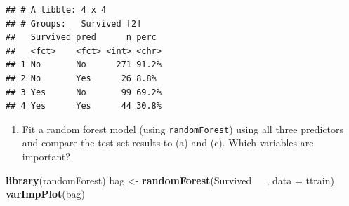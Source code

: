 \documentclass[]{article}
\newenvironment{Shaded}{\begin{snugshade}}{\end{snugshade}}
\newcommand{\DataTypeTok}[1]{\textcolor[rgb]{0.13,0.29,0.53}{#1}}
\newcommand{\DecValTok}[1]{\textcolor[rgb]{0.00,0.00,0.81}{#1}}
\newcommand{\FloatTok}[1]{\textcolor[rgb]{0.00,0.00,0.81}{#1}}
\newcommand{\KeywordTok}[1]{\textcolor[rgb]{0.13,0.29,0.53}{\textbf{#1}}}
\newcommand{\NormalTok}[1]{#1}
\newcommand{\OperatorTok}[1]{\textcolor[rgb]{0.81,0.36,0.00}{\textbf{#1}}}
\newcommand{\StringTok}[1]{\textcolor[rgb]{0.31,0.60,0.02}{#1}}
\providecommand{\tightlist}{%
  \setlength{\itemsep}{0pt}\setlength{\parskip}{0pt}}
\begin{document}
\begin{Shaded}
\end{Shaded}

\begin{verbatim}
## # A tibble: 4 x 4
## # Groups:   Survived [2]
##   Survived pred      n perc 
##   <fct>    <fct> <int> <chr>
## 1 No       No      271 91.2%
## 2 No       Yes      26 8.8% 
## 3 Yes      No       99 69.2%
## 4 Yes      Yes      44 30.8%
\end{verbatim}

\begin{enumerate}
\def\labelenumi{(\alph{enumi})}
\setcounter{enumi}{3}
\tightlist
\item
  Fit a random forest model (using \texttt{randomForest}) using all
  three predictors and compare the test set results to (a) and (c).
  Which variables are important?
\end{enumerate}

\begin{Shaded}
\begin{Highlighting}[]
\KeywordTok{library}\NormalTok{(randomForest)}
\NormalTok{bag <-}\StringTok{ }\KeywordTok{randomForest}\NormalTok{(Survived }\OperatorTok{~}\StringTok{ }\NormalTok{., }\DataTypeTok{data =}\NormalTok{ ttrain)}
\KeywordTok{varImpPlot}\NormalTok{(bag)}
\end{Highlighting}
\end{Shaded}
\end{document}
